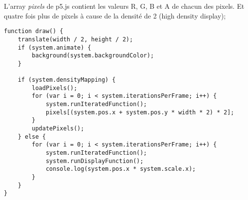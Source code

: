 L'array \textit{pixels} de p5.js contient les valeurs R, G, B et A de chacun des pixels. Et quatre fois plus de pixels à cause de la densité de 2 (high density display);

\begin{lstlisting}
function draw() {
    translate(width / 2, height / 2);
    if (system.animate) {
        background(system.backgroundColor);
    }
    
    if (system.densityMapping) {
        loadPixels();
        for (var i = 0; i < system.iterationsPerFrame; i++) {
            system.runIteratedFunction();
            pixels[(system.pos.x + system.pos.y * width * 2) * 2];
        }
        updatePixels();
    } else {
        for (var i = 0; i < system.iterationsPerFrame; i++) {
            system.runIteratedFunction();
            system.runDisplayFunction();
            console.log(system.pos.x * system.scale.x);
        }
    }
}
\end{lstlisting}